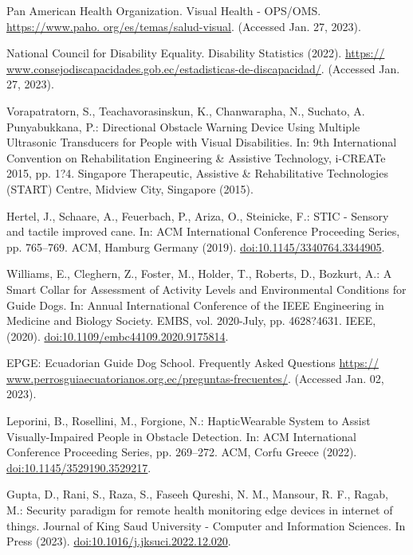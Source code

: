 \documentclass{svproc}
\begin{document}
%
%
\begin{thebibliography}{6}
%
Pan American Health Organization. Visual Health - OPS/OMS. \url{https://www.paho.
org/es/temas/salud-visual}. (Accessed Jan. 27, 2023).

National Council for Disability Equality. Disability Statistics (2022). \url{https://
www.consejodiscapacidades.gob.ec/estadisticas-de-discapacidad/}. (Accessed Jan. 27, 2023).

Vorapatratorn, S., Teachavorasinskun, K., Chanwarapha, N., Suchato, A. Punyabukkana,
P.: Directional Obstacle Warning Device Using Multiple Ultrasonic
Transducers for People with Visual Disabilities. In: 9th International Convention
on Rehabilitation Engineering \& Assistive Technology, i-CREATe 2015, pp. 1?4.
Singapore Therapeutic, Assistive \& Rehabilitative Technologies (START) Centre,
Midview City, Singapore (2015).

Hertel, J., Schaare, A., Feuerbach, P., Ariza, O., Steinicke, F.: STIC - Sensory and
tactile improved cane. In: ACM International Conference Proceeding Series, pp. 765–769. ACM, Hamburg Germany (2019). \url{doi:10.1145/3340764.3344905}.

Williams, E., Cleghern, Z., Foster, M., Holder, T., Roberts, D., Bozkurt, A.: A Smart
Collar for Assessment of Activity Levels and Environmental Conditions for Guide
Dogs. In: Annual International Conference of the IEEE Engineering in Medicine
and Biology Society. EMBS, vol. 2020-July, pp. 4628?4631. IEEE, (2020). \url{doi:10.1109/embc44109.2020.9175814}.

EPGE: Ecuadorian Guide Dog School. Frequently Asked Questions \url{https://
www.perrosguiaecuatorianos.org.ec/preguntas-frecuentes/}. (Accessed Jan. 02, 2023).

Leporini, B., Rosellini, M., Forgione, N.: HapticWearable System to Assist Visually-Impaired People in Obstacle Detection. In: ACM International Conference Proceeding
Series, pp. 269–272. ACM, Corfu Greece (2022). \url{doi:10.1145/3529190.3529217}.

Gupta, D., Rani, S., Raza, S., Faseeh Qureshi, N. M., Mansour, R. F., Ragab, M.:
Security paradigm for remote health monitoring edge devices in internet of things.
Journal of King Saud University - Computer and Information Sciences. In Press
(2023). \url{doi:10.1016/j.jksuci.2022.12.020}.


\end{thebibliography}
\end{document}
